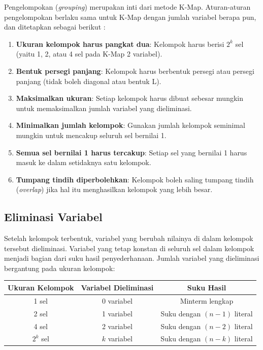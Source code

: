 Pengelompokan (\textit{grouping}) merupakan inti dari metode K-Map. Aturan-aturan pengelompokan berlaku sama untuk K-Map dengan jumlah variabel berapa pun, dan ditetapkan sebagai berikut \cite{wiki_karnaugh}:

\begin{enumerate}[label=\textbf{R\arabic*.}]
  \item \textbf{Ukuran kelompok harus pangkat dua}: Kelompok harus berisi $2^k$ sel (yaitu 1, 2, atau 4 sel pada K-Map 2 variabel).
  \item \textbf{Bentuk persegi panjang}: Kelompok harus berbentuk persegi atau persegi panjang (tidak boleh diagonal atau bentuk L).
  \item \textbf{Maksimalkan ukuran}: Setiap kelompok harus dibuat sebesar mungkin untuk memaksimalkan jumlah variabel yang dieliminasi.
  \item \textbf{Minimalkan jumlah kelompok}: Gunakan jumlah kelompok seminimal mungkin untuk mencakup seluruh sel bernilai 1.
  \item \textbf{Semua sel bernilai 1 harus tercakup}: Setiap sel yang bernilai 1 harus masuk ke dalam setidaknya satu kelompok.
  \item \textbf{Tumpang tindih diperbolehkan}: Kelompok boleh saling tumpang tindih (\textit{overlap}) jika hal itu menghasilkan kelompok yang lebih besar.
\end{enumerate}

\subsection{Eliminasi Variabel}

Setelah kelompok terbentuk, variabel yang berubah nilainya di dalam kelompok tersebut dieliminasi. Variabel yang tetap konstan di seluruh sel dalam kelompok menjadi bagian dari suku hasil penyederhanaan. Jumlah variabel yang dieliminasi bergantung pada ukuran kelompok:

\begin{center}
\renewcommand{\arraystretch}{1.2}
\begin{tabular}{|c|c|c|}
\hline
\textbf{Ukuran Kelompok} & \textbf{Variabel Dieliminasi} & \textbf{Suku Hasil} \\ \hline
1 sel & 0 variabel & Minterm lengkap \\ \hline
2 sel & 1 variabel & Suku dengan $(n-1)$ literal \\ \hline
4 sel & 2 variabel & Suku dengan $(n-2)$ literal \\ \hline
$2^k$ sel & $k$ variabel & Suku dengan $(n-k)$ literal \\ \hline
\end{tabular}
\end{center}

